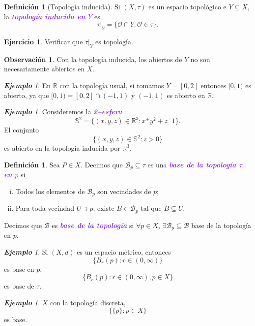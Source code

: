 \documentclass{article}
\theoremstyle{definition}
\newtheorem{definition}[theorem]{Definición}
\newtheorem{exercise}{Ejercicio}
\newtheorem*{obs}{Observación}
\theoremstyle{remark}
\newtheorem{example}[theorem]{\textbf{Ejemplo}}
\numberwithin{equation}{section}
\newcommand{\B}{\mathcal{B}}
\renewcommand{\O}{\mathcal{O}}
\newcommand{\R}{\mathbb{R}}
\renewcommand{\S}{\mathbb{S}}
\renewcommand{\t}{\tau}
\newcommand{\oo}{\infty}
\newcommand{\wea}[1]{\textcolor{BlueViolet}{\textbf{\emph{#1}}}}
\begin{document}
\begin{definition}
  [Topología inducida]
  Si $(X,\t)$ es un espacio topológico e $Y \subseteq X$, la \wea{topología inducida en $Y$} es
  \[\t|_Y = \{\O \cap Y \colon \O \in \t\}.\]
\end{definition}

\begin{exercise}
  Verificar que $\t|_Y$ es topología.
\end{exercise}

\begin{obs}
  Con la topología inducida, los abiertos de $Y$ no son necesariamente abiertos en $X$.
\end{obs}

\begin{example}
  En $\R$ con la topología usual, si tomamos $Y = [0,2]$ entonces $[0,1)$ es abierto, ya que $[0,1) = [0,2] \cap (-1,1)$ y $(-1,1)$ es abierto en $\R$.
\end{example}

\begin{example}
  Consideremos la \wea{2--esfera}
  \[\S^2 = \{(x,y,z) \in \R^3 \colon x^+ y^2 + z^= 1\}.\]
  El conjunto
  \[\{(x,y,z) \in \S^2 \colon z>0\}\]
  es abierto en la topología inducida por $\R^3$.
\end{example}

\begin{definition}
  Sea $P \in X$. Decimos que $\B_p \subseteq \t$ es una \wea{base de la topología $\t$ en $p$} si
  \begin{enumerate}[(i)]
    \item Todos los elementos de $\B_p$ son vecindades de $p$;
    \item Para toda vecindad $U \ni p$, existe $B \in \B_p$ tal que $B \subseteq U$.
  \end{enumerate}
  Decimos que $\B$ es \wea{base de la topología} si $\forall p \in X$, $\exists \B_p \subseteq \B$ base de la topología en $p$.
\end{definition}

\begin{example}
  Si $(X,d)$ es un espacio métrico, entonces
  \[\{B_r(p) \colon r \in (0,\oo)\}\]
  es base en $p$.
  \[\{B_r(p) \colon r \in (0,\oo), p \in X\}\]
  es base de $\t$.
\end{example}

\begin{example}
  $X$ con la topología discreta,
  \[\{\{p\} \colon p \in X\}\]
  es base.
\end{example}
\end{document}
